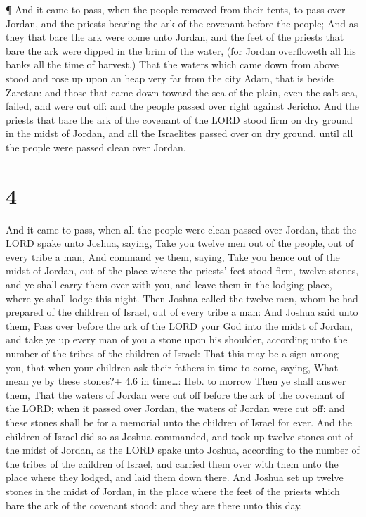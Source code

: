  ¶ And it came to pass, when the people removed from their
tents, to pass over Jordan, and the priests bearing the ark of the
covenant before the people;  And as they that bare the ark
were come unto Jordan, and the feet of the priests that bare the ark
were dipped in the brim of the water, (for Jordan overfloweth all his
banks all the time of harvest,)  That the waters which came
down from above stood and rose up upon an heap very far from the city
Adam, that is beside Zaretan: and those that came down toward the sea of
the plain, even the salt sea, failed, and were cut off: and the people
passed over right against Jericho.  And the priests that
bare the ark of the covenant of the LORD stood firm on dry ground in the
midst of Jordan, and all the Israelites passed over on dry ground, until
all the people were passed clean over Jordan.

\hypertarget{section-3}{%
\section{4}\label{section-3}}

 And it came to pass, when all the people were clean passed
over Jordan, that the LORD spake unto Joshua, saying,  Take
you twelve men out of the people, out of every tribe a man, 
And command ye them, saying, Take you hence out of the midst of Jordan,
out of the place where the priests' feet stood firm, twelve stones, and
ye shall carry them over with you, and leave them in the lodging place,
where ye shall lodge this night.  Then Joshua called the
twelve men, whom he had prepared of the children of Israel, out of every
tribe a man:  And Joshua said unto them, Pass over before
the ark of the LORD your God into the midst of Jordan, and take ye up
every man of you a stone upon his shoulder, according unto the number of
the tribes of the children of Israel:  That this may be a
sign among you, that when your children ask their fathers in time to
come, saying, What mean ye by these stones?+ 4.6 in time\ldots: Heb. to
morrow  Then ye shall answer them, That the waters of Jordan
were cut off before the ark of the covenant of the LORD; when it passed
over Jordan, the waters of Jordan were cut off: and these stones shall
be for a memorial unto the children of Israel for ever.  And
the children of Israel did so as Joshua commanded, and took up twelve
stones out of the midst of Jordan, as the LORD spake unto Joshua,
according to the number of the tribes of the children of Israel, and
carried them over with them unto the place where they lodged, and laid
them down there.  And Joshua set up twelve stones in the
midst of Jordan, in the place where the feet of the priests which bare
the ark of the covenant stood: and they are there unto this day.


